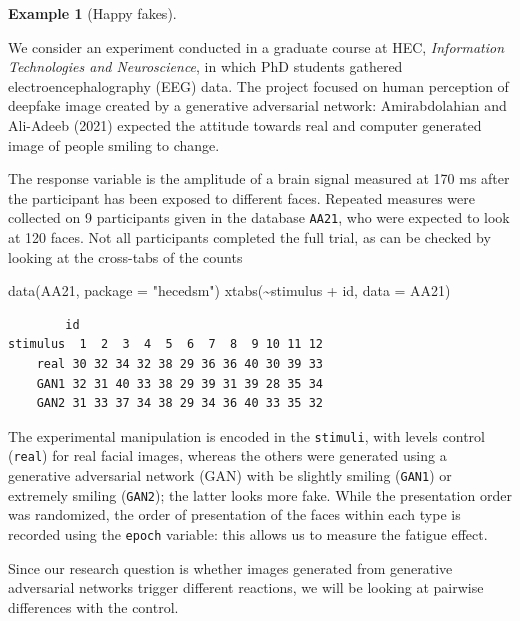 \documentclass[
  11pt,
  letterpaper,
]{scrbook}
\newenvironment{Shaded}{\begin{snugshade}}{\end{snugshade}}
\newcommand{\AttributeTok}[1]{\textcolor[rgb]{0.40,0.45,0.13}{#1}}
\newcommand{\FunctionTok}[1]{\textcolor[rgb]{0.28,0.35,0.67}{#1}}
\newcommand{\NormalTok}[1]{\textcolor[rgb]{0.00,0.23,0.31}{#1}}
\newcommand{\SpecialCharTok}[1]{\textcolor[rgb]{0.37,0.37,0.37}{#1}}
\newcommand{\StringTok}[1]{\textcolor[rgb]{0.13,0.47,0.30}{#1}}
\theoremstyle{definition}
\theoremstyle{definition}
\newtheorem{example}{Example}[chapter]
\theoremstyle{remark}
\begin{document}
\begin{example}[Happy
fakes]\protect\hypertarget{exm-happyfakes}{}\label{exm-happyfakes}

We consider an experiment conducted in a graduate course at HEC,
\emph{Information Technologies and Neuroscience}, in which PhD students
gathered electroencephalography (EEG) data. The project focused on human
perception of deepfake image created by a generative adversarial
network: Amirabdolahian and Ali-Adeeb (2021) expected the attitude
towards real and computer generated image of people smiling to change.

The response variable is the amplitude of a brain signal measured at 170
ms after the participant has been exposed to different faces. Repeated
measures were collected on 9 participants given in the database
\texttt{AA21}, who were expected to look at 120 faces. Not all
participants completed the full trial, as can be checked by looking at
the cross-tabs of the counts

\begin{Shaded}
\begin{Highlighting}[]
\FunctionTok{data}\NormalTok{(AA21, }\AttributeTok{package =} \StringTok{"hecedsm"}\NormalTok{)}
\FunctionTok{xtabs}\NormalTok{(}\SpecialCharTok{\textasciitilde{}}\NormalTok{stimulus }\SpecialCharTok{+}\NormalTok{ id, }\AttributeTok{data =}\NormalTok{ AA21)}
\end{Highlighting}
\end{Shaded}

\begin{verbatim}
        id
stimulus  1  2  3  4  5  6  7  8  9 10 11 12
    real 30 32 34 32 38 29 36 36 40 30 39 33
    GAN1 32 31 40 33 38 29 39 31 39 28 35 34
    GAN2 31 33 37 34 38 29 34 36 40 33 35 32
\end{verbatim}

The experimental manipulation is encoded in the \texttt{stimuli}, with
levels control (\texttt{real}) for real facial images, whereas the
others were generated using a generative adversarial network (GAN) with
be slightly smiling (\texttt{GAN1}) or extremely smiling
(\texttt{GAN2}); the latter looks more fake. While the presentation
order was randomized, the order of presentation of the faces within each
type is recorded using the \texttt{epoch} variable: this allows us to
measure the fatigue effect.

Since our research question is whether images generated from generative
adversarial networks trigger different reactions, we will be looking at
pairwise differences with the control.


\end{example}
\end{document}
